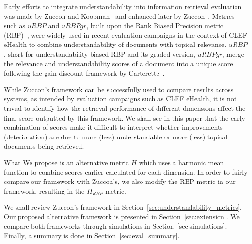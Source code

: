 Early efforts to integrate understandability into information retrieval evaluation was made by Zuccon and Koopman~\cite{zuccon14} and enhanced later by Zuccon~\cite{zuccon16}.
Metrics such as $uRBP$ and $uRBPgr$, built upon the Rank Biased Precision metric (RBP)~\cite{moffat08}, were widely used in recent evaluation campaigns in the context of CLEF eHealth to combine understandability of documents with topical relevance.
$uRBP$, short for understandability-biased RBP and its graded version, $uRBPgr$, merge the relevance and understandability scores of a document into a unique score following the gain-discount framework by Carterette~\cite{carterette11}.

While Zuccon's framework can be successfully used to compare results across systems, as intended by evaluation campaigns such as CLEF eHealth, it is not trivial to identify how the retrieval performance of different dimensions affect the final score outputted by this framework.
We shall see in this paper that the early combination of scores make it difficult to interpret whether improvements (deterioration) are due to more (less) understandable or more (less) topical documents being retrieved.

What We propose is an alternative metric $H$ which uses a harmonic mean function to combine scores earlier calculated for each dimension.
In order to fairly compare our framework with Zuccon's, we also modify the RBP metric in our framework, resulting in the $H_{RBP}$ metric.

We shall review Zuccon's framework in Section~\ref{sec:understandability_metrics}. 
Our proposed alternative framework is presented in Section~\ref{sec:extension}.
We compare both frameworks through simulations in Section~\ref{sec:simulations}.
Finally, a summary is done in Section~\ref{sec:eval_summary}.



